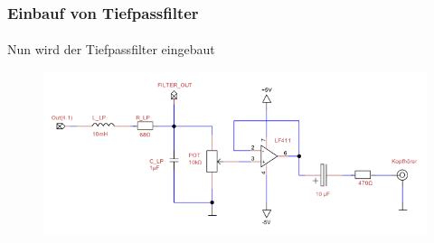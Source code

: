 \begin{frame}
    \frametitle{Einbauf von Tiefpassfilter}
    \framesubtitle{}
    \begin{block}{}
        Nun wird der Tiefpassfilter eingebaut
    \end{block}
    \begin{figure}[H]
    \begin{center}
            \includegraphics[scale=0.5]{./img/schaltung/verstaerker.png}
    \end{center}
    \end{figure}
\end{frame}

